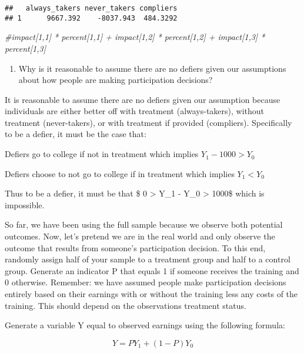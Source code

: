 \documentclass[
]{article}
\newenvironment{Shaded}{\begin{snugshade}}{\end{snugshade}}
\newcommand{\CommentTok}[1]{\textcolor[rgb]{0.56,0.35,0.01}{\textit{#1}}}
\providecommand{\tightlist}{%
  \setlength{\itemsep}{0pt}\setlength{\parskip}{0pt}}
\begin{document}
\begin{verbatim}
##   always_takers never_takers compliers
## 1      9667.392    -8037.943  484.3292
\end{verbatim}

\begin{Shaded}
\begin{Highlighting}[]
\CommentTok{\#impact[1,1] * percent[1,1] + impact[1,2] * percent[1,2] + impact[1,3] * percent[1,3]}
\end{Highlighting}
\end{Shaded}

\begin{enumerate}
\def\labelenumi{\arabic{enumi}.}
\setcounter{enumi}{3}
\tightlist
\item
  Why is it reasonable to assume there are no defiers given our
  assumptions about how people are making participation decisions?
\end{enumerate}

It is reasonable to assume there are no defiers given our assumption
because individuals are either better off with treatment
(always-takers), without treatment (never-takers), or with treatment if
provided (compliers). Specifically to be a defier, it must be the case
that:

Defiers go to college if not in treatment which implies
\(Y_1 - 1000 > Y_0\)

Defiers choose to not go to college if in treatment which implies
\(Y_1 < Y_0\)

Thus to be a defier, it must be that \$ 0 \textgreater{} Y\_1 - Y\_0
\textgreater{} 1000\$ which is impossible.

\newpage

So far, we have been using the full sample because we observe both
potential outcomes. Now, let's pretend we are in the real world and only
observe the outcome that results from someone's participation decision.
To this end, randomly assign half of your sample to a treatment group
and half to a control group. Generate an indicator P that equals 1 if
someone receives the training and 0 otherwise. Remember: we have assumed
people make participation decisions entirely based on their earnings
with or without the training less any costs of the training. This should
depend on the observations treatment status.

Generate a variable Y equal to observed earnings using the following
formula:

\[
Y = PY_1 + (1-P)Y_0
\]
\end{document}
